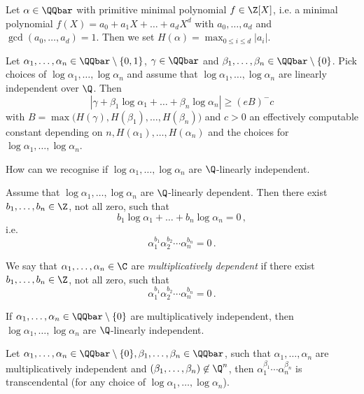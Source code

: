 \begin{defn*}
	Let \( \alpha \in \QQbar \) with primitive minimal polynomial \( f \in \Z[X] \), i.e. a minimal polynomial \( f(X) = a_0 + a_1X + \dots + a_dX^d \) with \( a_0, \dotsc, a_d \) and \( \gcd(a_0, \dotsc, a_d) = 1 \).
	Then we set \( H(\alpha) = \max_{0 \leq i \leq d} |a_i| \).
\end{defn*}

\begin{thmn}
	Let \( \alpha_1, \dotsc, \alpha_n \in \QQbar \setminus \{0,1\} \), \( \gamma \in \QQbar \) and \( \beta_1, \dotsc, \beta_n \in \QQbar \setminus \{0\} \).
	Pick choices of \( \log\alpha_1, \dotsc, \log\alpha_n \) and assume that \( \log\alpha_1, \dotsc, \log\alpha_n \) are linearly independent over \( \Q \).
	Then 
	\[ \left| \gamma + \beta_1 \log\alpha_1 + \dots + \beta_n \log\alpha_n \right| \geq (eB)^-c \]
	with \( B = \max \big( H(\gamma), H(\beta_1), \dotsc, H(\beta_n) \big) \) and \( c>0 \) an effectively computable constant depending on \( n, H(\alpha_1), \dotsc, H(\alpha_n) \) and the choices for \( \log\alpha_1, \dotsc, \log\alpha_n \).
\end{thmn}

\begin{frage*}
	How can we recognise if \( \log\alpha_1, \dotsc, \log\alpha_n \) are \( \Q \)-linearly independent.
\end{frage*}

Assume that \( \log\alpha_1, \dotsc, \log\alpha_n \) are \( \Q \)-linearly dependent.
Then there exist \( b_1, \dotsc, b_n \in \Z \), not all zero, such that
\[ b_1 \log\alpha_1 + \dots + b_n \log\alpha_n = 0 \,, \]
i.e.
\[ \alpha_1^{b_1} \alpha_2^{b_2} \dotsm \alpha_n^{b_n} = 0 \,. \]

\begin{defn*}
	We say that \( \alpha_1, \dotsc, \alpha_n \in \C \) are \emph{multiplicatively dependent} if there exist \( b_1, \dotsc, b_n \in \Z \), not all zero, such that
	\[ \alpha_1^{b_1} \alpha_2^{b_2} \dotsm \alpha_n^{b_n} = 0 \,. \]
\end{defn*}

\begin{rem*}
	If \( \alpha_1, \dotsc, \alpha_n \in \QQbar \setminus \{0\} \) are multiplicatively independent, then \( \log\alpha_1, \dotsc, \log\alpha_n \) are \( \Q \)-linearly independent.
\end{rem*}

\begin{cor}
	Let \( \alpha_1, \dotsc, \alpha_n \in \QQbar \setminus \{0\}, \beta_1, \dotsc, \beta_n \in \QQbar \), such that \( \alpha_1, \dotsc, \alpha_n \) are multiplicatively independent and \( (\beta_1, \dotsc, \beta_n) \not\in \Q^n \), then \( \alpha_1^{\beta_1} \dotsm \alpha_n^{\beta_n} \) is transcendental (for any choice of \( \log\alpha_1, \dotsc, \log\alpha_n \)).
\end{cor}